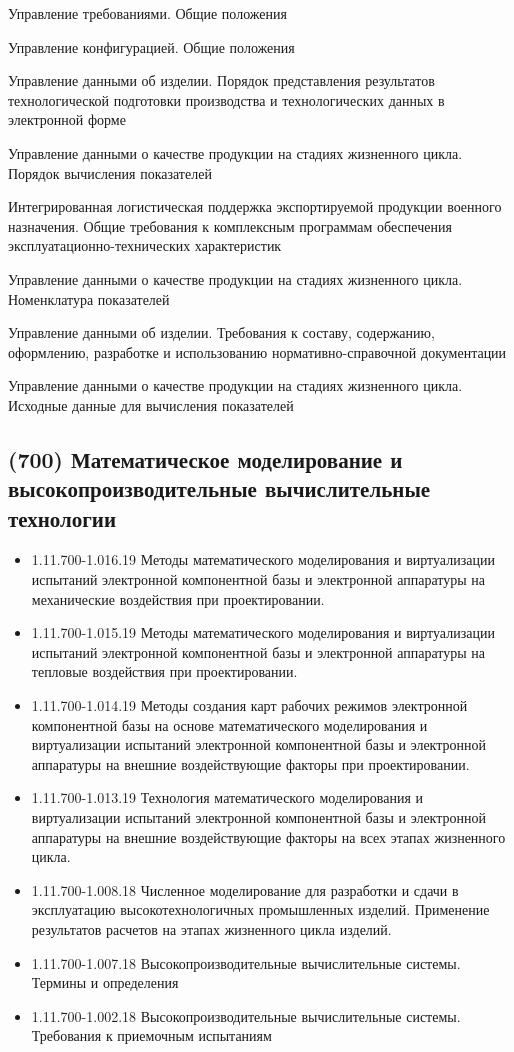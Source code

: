 Управление требованиями. Общие положения

Управление конфигурацией. Общие положения

Управление данными об изделии. Порядок представления результатов технологической подготовки производства и технологических данных в электронной форме

Управление данными о качестве продукции на стадиях жизненного цикла. Порядок вычисления показателей

Интегрированная логистическая поддержка экспортируемой продукции военного назначения. Общие требования к комплексным программам обеспечения эксплуатационно-технических характеристик

Управление данными о качестве продукции на стадиях жизненного цикла. Номенклатура показателей

Управление данными об изделии. Требования к составу, содержанию, оформлению, разработке и использованию нормативно-справочной документации

Управление данными о качестве продукции на стадиях жизненного цикла. Исходные данные для вычисления показателей

\subsection{(700) Математическое моделирование
	и высокопроизводительные вычислительные технологии}

\begin{itemize}
	\item 1.11.700-1.016.19
Методы математического моделирования и виртуализации испытаний электронной компонентной базы и электронной аппаратуры на механические воздействия при проектировании.
	\item 1.11.700-1.015.19
Методы математического моделирования и виртуализации испытаний электронной компонентной базы и электронной аппаратуры на тепловые воздействия при проектировании.
	\item 1.11.700-1.014.19
Методы создания карт рабочих режимов электронной компонентной базы на основе математического моделирования и виртуализации испытаний электронной компонентной базы и электронной аппаратуры на внешние воздействующие факторы при проектировании.
	\item 1.11.700-1.013.19
Технология математического моделирования и виртуализации испытаний электронной компонентной базы и электронной аппаратуры на внешние воздействующие факторы на всех этапах жизненного цикла.
	\item 1.11.700-1.008.18
Численное моделирование для разработки и сдачи в эксплуатацию высокотехнологичных промышленных изделий. Применение результатов расчетов на этапах жизненного цикла изделий.
	\item 1.11.700-1.007.18
Высокопроизводительные вычислительные системы. Термины и определения
	\item 1.11.700-1.002.18
Высокопроизводительные вычислительные системы. Требования к приемочным испытаниям
\end{itemize}

